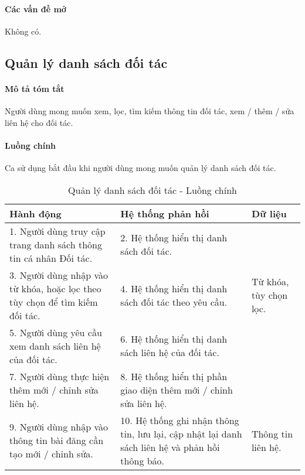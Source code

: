 \documentclass[./../main.tex]{subfiles}
\begin{document}
\paragraph*{Các vấn đề mở}

Không có.

\subsection{Quản lý danh sách đối tác}

\paragraph*{Mô tả tóm tắt}

Người dùng mong muốn xem, lọc, tìm kiếm thông tin đối tác, xem / thêm / sửa liên hệ cho đối tác.

\paragraph*{Luồng chính} Ca sử dụng bắt đầu khi người dùng mong muốn quản lý danh sách đối tác.

\begin{table}[H]
	\caption{Quản lý danh sách đối tác - Luồng chính}
	\label{tab:orgAdmin_manage_partners}
	\begin{tabularx}{\textwidth}{|X|X|X|}
		\hline
		\textbf{Hành động}                                                          & \textbf{Hệ thống phản hồi}                                                                      & \textbf{Dữ liệu}       \\ \hline
		1. Người dùng truy cập trang danh sách thông tin cá nhân Đối tác.           & 2. Hệ thống hiển thị danh sách đối tác.                                                         &                        \\ \hline
		3. Người dùng nhập vào từ khóa, hoặc lọc theo tùy chọn để tìm kiếm đối tác. & 4. Hệ thống hiển thị danh sách đối tác theo yêu cầu.                                            & Từ khóa, tùy chọn lọc. \\ \hline
		5. Người dùng yêu cầu xem danh sách liên hệ của đối tác.                    & 6. Hệ thống hiển thị danh sách liên hệ của đối tác.                                             &                        \\ \hline
		7. Người dùng thực hiện thêm mới / chỉnh sửa liên hệ.                       & 8. Hệ thống hiển thị phần giao diện thêm mới / chỉnh sửa liên hệ.                               &                        \\ \hline
		9. Người dùng nhập vào thông tin bài đăng cần tạo mới / chỉnh sửa.          & 10. Hệ thống ghi nhận thông tin, lưu lại, cập nhật lại danh sách liên hệ và phản hồi thông báo. & Thông tin liên hệ.     \\ \hline
	\end{tabularx}
\end{table}
\end{document}
